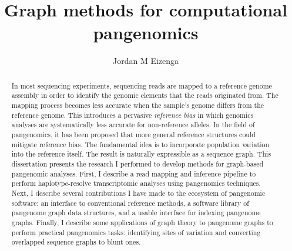 \documentclass[11pt]{ucthesis}
\begin{document}

\title{Graph methods for computational pangenomics}
\author{Jordan M Eizenga}
\deanlinethree{}

\begin{frontmatter}

\maketitle
\copyrightpage

\tableofcontents
\listoffigures
\listoftables

\begin{abstract}

In most sequencing experiments, sequencing reads are mapped to a reference genome assembly in order to identify the genomic elements that the reads originated from. The mapping process becomes less accurate when the sample's genome differs from the reference genome. This introduces a pervasive \emph{reference bias} in which genomics analyses are systematically less accurate for non-reference alleles. In the field of pangenomics, it has been proposed that more general reference structures could mitigate reference bias. The fundamental idea is to incorporate population variation into the reference itself. The result is naturally expressible as a sequence graph. This dissertation presents the research I performed to develop methods for graph-based pangenomic analyses. First, I describe a read mapping and inference pipeline to perform haplotype-resolve transcriptomic analyses using pangenomics techniques. Next, I describe several contributions I have made to the ecosystem of pangenomic software: an interface to conventional reference methods, a software library of pangenome graph data structures, and a usable interface for indexing pangenome graphs. Finally, I describe some applications of graph theory to pangenome graphs to perform practical pangenomics tasks: identifying sites of variation and converting overlapped sequence graphs to blunt ones.

\end{abstract}


\end{frontmatter}
\end{document}
